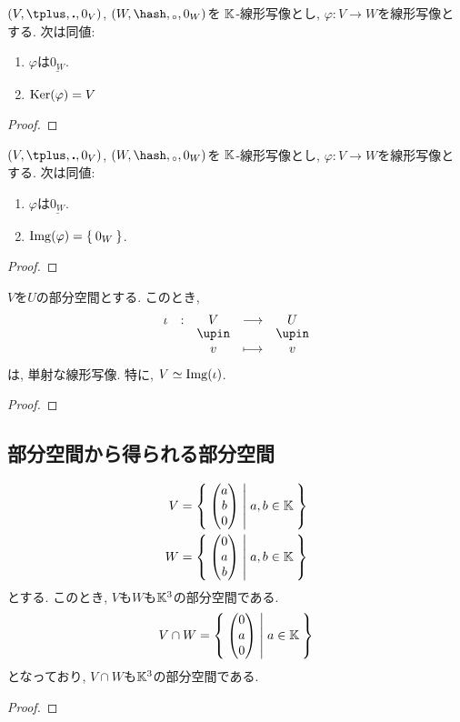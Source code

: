 \begin{prop}
  $(V,\plus,\act,0_V)$,
  $(W,\pplus,\aact,0_W)$を
  $\mathbb{K}$-線形写像とし,
  $\varphi\colon V\to W$を線形写像とする.
  次は同値:
  \begin{enumerate}
  \item $\varphi$は$\underline{0_W}$.
  \item $\operatorname{Ker}(\varphi)=V$
  \end{enumerate}
\end{prop}
\begin{proof}\end{proof}

\begin{prop}
  $(V,\plus,\act,0_V)$,
  $(W,\pplus,\aact,0_W)$を
  $\mathbb{K}$-線形写像とし,
  $\varphi\colon V\to W$を線形写像とする.
  次は同値:
  \begin{enumerate}
  \item $\varphi$は$\underline{0_W}$.
  \item $\operatorname{Img}(\varphi)=\Set{0_W}$.
  \end{enumerate}
\end{prop}
\begin{proof}\end{proof}

\begin{prop}
  $V$を$U$の部分空間とする.
  このとき,
  \begin{align*}
    \shazo{\iota}{V}{U}
    {v}{v}
  \end{align*}
  は, 単射な線形写像.
  特に, $V\simeq \operatorname{Img}(\iota)$.
\end{prop}
\begin{proof}\end{proof}

\subsection{部分空間から得られる部分空間}
\label{sec:subspace:sub}

\begin{example}
  \begin{align*}
    V&=\Set{\begin{pmatrix}a\\b\\0\end{pmatrix}|a,b\in\mathbb{K}}\\
    W&=\Set{\begin{pmatrix}0\\a\\b\end{pmatrix}|a,b\in\mathbb{K}}
  \end{align*}
  とする.
  このとき, $V$も$W$も$\mathbb{K}^3$の部分空間である.
  \begin{align*}
    V\cap W&=\Set{\begin{pmatrix}0\\a\\0\end{pmatrix}|a\in\mathbb{K}}\\
  \end{align*}
  となっており, $V\cap W$も$\mathbb{K}^3$の部分空間である.
\end{example}
\begin{proof}\end{proof}

